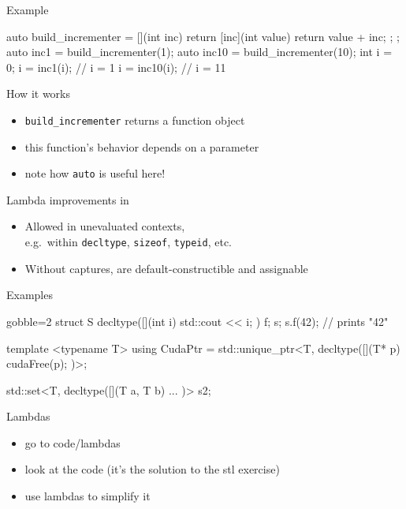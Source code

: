 \begin{frame}[fragile]
  \begin{exampleblock}{Example}
    \begin{cppcode*}{}
      auto build_incrementer = [](int inc) {
        return [inc](int value) { return value + inc; };
      };
      auto inc1 = build_incrementer(1);
      auto inc10 = build_incrementer(10);
      int i = 0;
      i = inc1(i);   // i = 1
      i = inc10(i);  // i = 11
    \end{cppcode*}
  \end{exampleblock}
  \begin{block}{How it works}
    \begin{itemize}
      \item \texttt{build_incrementer} returns a function object
      \item this function's behavior depends on a parameter
      \item note how \texttt{auto} is useful here!
    \end{itemize}
  \end{block}
\end{frame}

\begin{frame}[fragile]
  \begin{block}{Lambda improvements in }
    \begin{itemize}
      \item Allowed in unevaluated contexts,\\
            e.g.\ within \texttt{decltype}, \texttt{sizeof}, \texttt{typeid}, etc.
      \item Without captures, are default-constructible and assignable
    \end{itemize}
  \end{block}
  \begin{exampleblock}{Examples}
    \small
    \begin{cppcode*}{gobble=2}
      struct S {
        decltype([](int i) { std::cout << i; }) f;
      } s;
      s.f(42); // prints "42"

      template <typename T>
      using CudaPtr = std::unique_ptr<T,
                        decltype([](T* p){ cudaFree(p); })>;

      std::set<T, decltype([](T a, T b) { ... })> s2;
    \end{cppcode*}
  \end{exampleblock}

\end{frame}

\begin{frame}[fragile]
  \begin{exercise}{Lambdas}
    \begin{itemize}
    \item go to code/lambdas
    \item look at the code (it's the solution to the stl exercise)
    \item use lambdas to simplify it
    \end{itemize}
  \end{exercise}
\end{frame}
